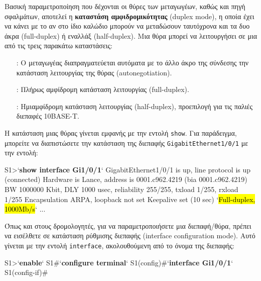 \documentclass{EdipyLabs} %
\begin{document}
Βασική παραμετροποίηση που δέχονται οι θύρες των μεταγωγέων, καθώς και πηγή σφαλμάτων, αποτελεί η \textbf{καταστάση αμφιδρομικότητας} (duplex mode), η οποία έχει να κάνει με το αν στο ίδιο καλώδιο μπορούν να μεταδώσουν ταυτόχρονα και τα δυο άκρα (full-duplex) ή εναλλάξ (half-duplex). Μια θύρα μπορεί να λειτουργήσει σε μια από τις τρεις παρακάτω καταστάσεις:
\begin{itemize}
	\item[\ip{auto}:] Ο μεταγωγέας διαπραγματεύεται αυτόματα με το άλλο άκρο της σύνδεσης την κατάσταση λειτουργίας της θύρας (autonegotiation).
	\item[\ip{full}:] Πλήρως αμφίδρομη κατάσταση λειτουργίας (full-duplex).
	\item[\ip{half}:] Ημιαμφίδρομη κατάσταση λειτουργίας (half-duplex), προεπιλογή για τις παλιές διεπαφές \mbox{10BASE-T}.
\end{itemize}


Η κατάσταση μιας θύρας γίνεται εμφανής με την εντολή \texttt{show}. Για παράδειγμα, μπορείτε να διαπιστώσετε την κατάσταση της διεπαφής \texttt{GigabitEthernet1/0/1} με την εντολή:

\begin{CommandBox}
S1>`\textbf{show interface Gi1/0/1}`
GigabitEthernet1/0/1 is up, line protocol is up (connected)
  Hardware is Lance, address is 0001.c962.4219 (bia 0001.c962.4219)
 BW 1000000 Kbit, DLY 1000 usec,
     reliability 255/255, txload 1/255, rxload 1/255
  Encapsulation ARPA, loopback not set
  Keepalive set (10 sec)
  `\hl{Full-duplex, 1000Mb/s}`
  ...
\end{CommandBox}

Όπως και στους δρομολογητές, για να παραμετροποιήσετε μια διεπαφή/θύρα, πρέπει να εισέλθετε σε κατάσταση ρύθμισης διεπαφής (interface configuration mode). Αυτό γίνεται με την εντολή \texttt{interface}, ακολουθούμενη από το όνομα της διεπαφής:

\begin{CommandBox}
S1>`\textbf{enable}`
S1#`\textbf{configure terminal}`
S1(config)#`\textbf{interface Gi1/0/1}`
S1(config-if)# 
\end{CommandBox}
\end{document}
